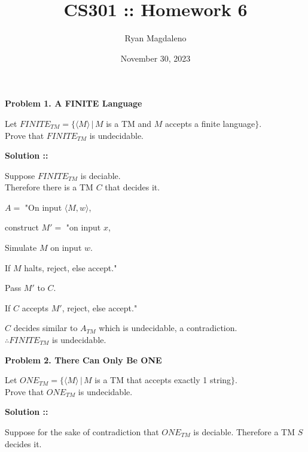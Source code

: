 \documentclass[11pt]{article}
\date{November 30, 2023}
\title{CS301 :: Homework 6}
\author{Ryan Magdaleno}
\begin{document}
\maketitle


\textbf{Problem 1. A FINITE Language}

Let $FINITE_{TM} = \{\langle M\rangle \,|\, M$ is a TM and $M$ accepts 
a finite language$\}$. \\
Prove that $FINITE_{TM}$ is undecidable.

\vspace{5px}\textbf{Solution ::}

Suppose $FINITE_{TM}$ is deciable. \\
Therefore there is a TM $C$ that decides it.

\vspace{5px}$A = $ "On input $\langle M, w\rangle$,

\hspace{30px}construct $M'=$ "on input $x$,

\hspace{45px}Simulate $M$ on input $w$.

\hspace{45px}If $M$ halts, reject, else accept."

\hspace{30px}Pass $M'$ to $C$.

\hspace{30px}If $C$ accepts $M'$, reject, else accept."

\vspace{5px}$C$ decides similar to $A_{TM}$ which is undecidable, a contradiction. \\
$\therefore FINITE_{TM}$ is undecidable.
\pagebreak


\textbf{Problem 2. There Can Only Be ONE}

Let $ONE_{TM} = \{\langle M\rangle \,|\, M$ is a TM that accepts exactly 1 string$\}$.
\\Prove that $ONE_{TM}$ is undecidable.

\vspace{5px}\textbf{Solution ::}

Suppose for the sake of contradiction that $ONE_{TM}$ is deciable. Therefore a TM
$S$ decides it.
\end{document}
